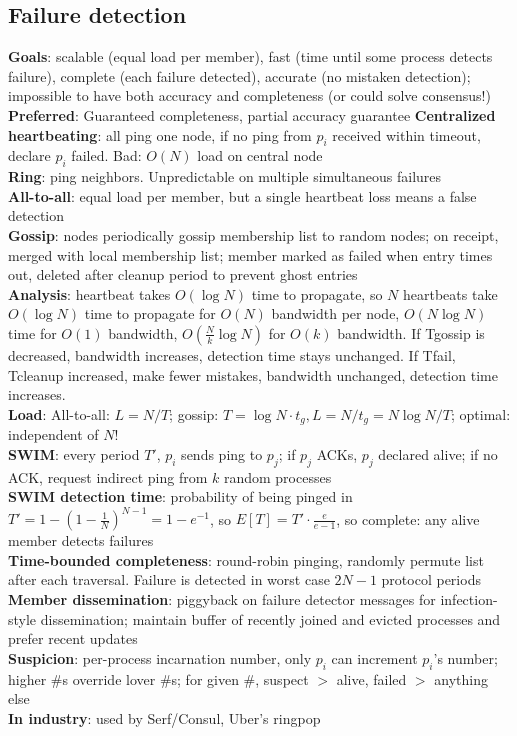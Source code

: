 \documentclass{article}
\begin{document}
\begin{multicols*}{3}
\section{Failure detection}
\textbf{Goals}: scalable (equal load per member), fast (time until some process detects failure), complete (each failure detected), accurate (no mistaken detection); impossible to have both accuracy and completeness (or could solve consensus!) \\
\textbf{Preferred}: Guaranteed completeness, partial accuracy guarantee
\textbf{Centralized heartbeating}: all ping one node, if no ping from $p_i$ received within timeout, declare $p_i$ failed. Bad: $O(N)$ load on central node \\
\textbf{Ring}: ping neighbors. Unpredictable on multiple simultaneous failures \\
\textbf{All-to-all}: equal load per member, but a single heartbeat loss means a false detection \\
\textbf{Gossip}: nodes periodically gossip membership list to random nodes; on receipt, merged with local membership list; member marked as failed when entry times out, deleted after cleanup period to prevent ghost entries \\
\textbf{Analysis}: heartbeat takes $O(\log{N})$ time to propagate, so $N$ heartbeats take $O(\log{N})$ time to propagate for $O(N)$ bandwidth per node, $O(N\log{N})$ time for $O(1)$ bandwidth, $O(\frac{N}{k}\log{N})$ for $O(k)$ bandwidth. If Tgossip is decreased, bandwidth increases, detection time stays unchanged. If Tfail, Tcleanup increased, make fewer mistakes, bandwidth unchanged, detection time increases. \\
\textbf{Load}: All-to-all: $L=N/T$; gossip: $T=\log{N}\cdot t_g, L=N/t_g=N\log{N}/T$; optimal: independent of $N$! \\
\textbf{SWIM}: every period $T\prime$, $p_i$ sends ping to $p_j$; if $p_j$ ACKs, $p_j$ declared alive; if no ACK, request indirect ping from $k$ random processes \\
\textbf{SWIM detection time}: probability of being pinged in $T\prime = 1-(1-\frac{1}{N})^{N-1}=1-e^{-1}$, so $E[T] = T\prime\cdot\frac{e}{e-1}$, so complete: any alive member detects failures \\
\textbf{Time-bounded completeness}: round-robin pinging, randomly permute list after each traversal. Failure is detected in worst case $2N-1$ protocol periods \\
\textbf{Member dissemination}: piggyback on failure detector messages for infection-style dissemination; maintain buffer of recently joined and evicted processes and prefer recent updates \\
\textbf{Suspicion}: per-process incarnation number, only $p_i$ can increment $p_i$'s number; higher #s override lover #s; for given #, suspect $>$ alive, failed $>$ anything else \\
\textbf{In industry}: used by Serf/Consul, Uber's ringpop


\end{multicols*}
\end{document}
